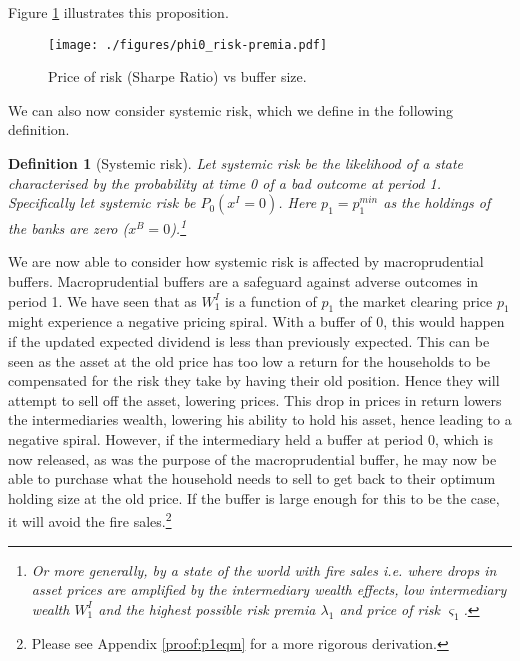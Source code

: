 \documentclass[11pt]{article}
\newtheorem{definition}{Definition}%
\begin{document}
\noindent Figure \ref{f_probSRvsBuffer} illustrates this proposition.

\begin{figure}[h]
\centering
\texttt{[image: ./figures/phi0\_risk-premia.pdf]}
\caption{%
Price of risk (Sharpe Ratio) vs buffer size.\\%
}
\label{f_probSRvsBuffer}

\end{figure}


We can also now consider systemic risk, which we define in the following definition.

\begin{definition}[Systemic risk]
Let systemic risk be the likelihood of a state characterised by the probability at time 0 of a bad outcome at period 1. Specifically let systemic risk be $P_0 (x^I=0)$. Here $p_1 = p_1^{min}$ as the holdings of the banks are zero ($x^B = 0$).\footnote{Or more generally, by a state of the world with fire sales i.e. where drops in asset prices are amplified by the intermediary wealth effects, low intermediary wealth $W^I_1$ and the highest possible risk premia $\lambda_1$ and price of risk $\varsigma_1$.}
\end{definition}

We are now able to consider how systemic risk is affected by macroprudential buffers. Macroprudential buffers are a safeguard against adverse outcomes in period 1. We have seen that as $W^I_1$ is a function of $p_1$ the market clearing price $p_1$ might experience a negative pricing spiral. With a buffer of 0, this would happen if the updated expected dividend is less than previously expected. This can be seen as the asset at the old price has too low a return for the households to be compensated for the risk they take by having their old position. Hence they will attempt to sell off the asset, lowering prices. This drop in prices in return lowers the intermediaries wealth, lowering his ability to hold his asset, hence leading to a negative spiral. However, if the intermediary held a buffer at period 0, which is now released, as was the purpose of the macroprudential buffer, he may now be able to purchase what the household needs to sell to get back to their optimum holding size at the old price. If the buffer is large enough for this to be the case, it will avoid the fire sales.\footnote{Please see Appendix \ref{proof:p1eqm} %
for a more rigorous derivation.}
\end{document}

